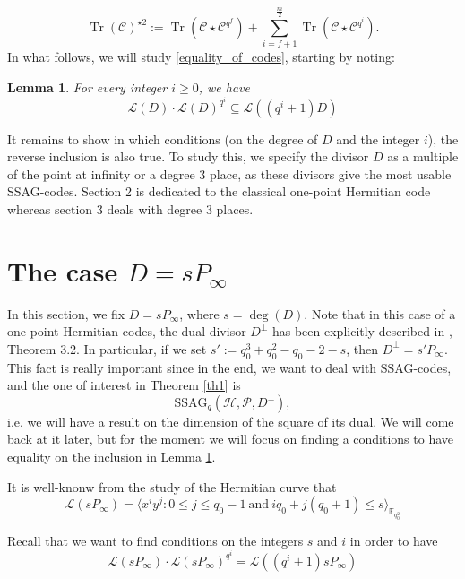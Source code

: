 \documentclass[a4paper]{article}
\newtheorem{lem1}{Lemma}
\newcommand{\calP}{\mathcal{P}}
\newcommand{\calH}{\mathcal{H}}
\newcommand{\calL}{\mathcal{L}}
\newcommand{\Tr}{\operatorname{Tr}}
\begin{document}
\begin{equation}\label{eq:dim_tr_inclusion}
	\Tr(\mathcal{C})^{\star2}:=\Tr(\mathcal{C} \star \mathcal{C}^{q^f}) + \sum_{i= f+1}^{\frac{m}{2}} \Tr(\mathcal{C} \star \mathcal{C}^{q^i}).
\end{equation}
In what follows, we will study \eqref{equality_of_codes}, starting by noting: 

\begin{lem1} \label{lemma1}
For every integer $i \geq 0$, we have
\[\calL(D) \cdot \calL(D)^{q^i} \subseteq \calL((q^i+1)D)\]
\end{lem1}

It remains to show in which conditions (on the degree of $D$ and the integer $i$), the reverse inclusion is also true. To study this, we specify the divisor $D$ as a multiple of the point at infinity or a degree 3 place, as these divisors give the most usable SSAG-codes. Section 2 is dedicated to the classical one-point Hermitian code whereas section 3 deals with degree 3 places.


\section{The case $D=sP_{\infty}$}

In this section, we fix $D=sP_{\infty}$, where $s=\deg(D)$. Note that in this case of a one-point Hermitian codes, the dual divisor $D^{\perp}$ has been explicitly described in \cite{sabi}, Theorem 3.2. In particular, if we set $s' := q_0^3+q_0^2-q_0-2-s$, then $D^{\perp} = s'P_{\infty}$. This fact is really important since in the end, we want to deal with \textrm{SSAG}-codes, and the one of interest in Theorem \ref{th1} is 
\[\mathrm{SSAG}_{q}(\calH,\calP,D^{\perp}),\]
i.e. we will have a result on the dimension of the square of its dual. We will come back at it later, but for the moment we will focus on finding a conditions to have equality on the inclusion in Lemma \ref{lemma1}. 

\noindent It is well-knonw from the study of the Hermitian curve that
\begin{equation} \label{rr_p_inf}
\calL(sP_{\infty}) = \langle x^iy^j : 0 \leq j \leq q_0-1 \ \mathrm{and} \ iq_0+j(q_0+1) \leq s \rangle_{\mathbb{F}_{q_0^2}}
\end{equation}

Recall that we want to find conditions on the integers $s$ and $i$ in order to have 
\begin{equation} \label{equality}
\calL(sP_{\infty}) \cdot \calL(sP_{\infty})^{q^i} = \calL((q^i+1)sP_{\infty})  
\end{equation}
\end{document}
